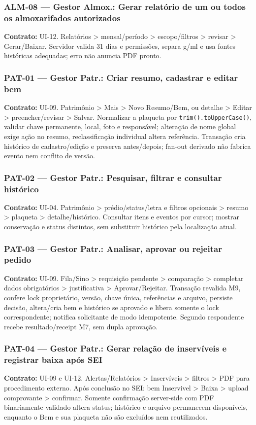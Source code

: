 \subsubsection{ALM-08 --- Gestor Almox.: Gerar relatório de um ou todos os almoxarifados autorizados}
\textbf{Contrato:} UI-12. Relatórios > mensal/período > escopo/filtros > revisar > Gerar/Baixar. Servidor valida 31 dias e permissões, separa g/ml e usa fontes históricas adequadas; erro não anuncia PDF pronto.

\subsubsection{PAT-01 --- Gestor Patr.: Criar resumo, cadastrar e editar bem}
\textbf{Contrato:} UI-09. Patrimônio > Mais > Novo Resumo/Bem, ou detalhe > Editar > preencher/revisar > Salvar. Normalizar a plaqueta por \texttt{trim().toUpperCase()}, validar chave permanente, local, foto e responsável; alteração de nome global exige ação no resumo, reclassificação individual altera referência. Transação cria histórico de cadastro/edição e preserva antes/depois; fan-out derivado não fabrica evento nem conflito de versão.

\subsubsection{PAT-02 --- Gestor Patr.: Pesquisar, filtrar e consultar histórico}
\textbf{Contrato:} UI-04. Patrimônio > prédio/status/letra e filtros opcionais > resumo > plaqueta > detalhe/histórico. Consultar itens e eventos por cursor; mostrar conservação e status distintos, sem substituir histórico pela localização atual.

\subsubsection{PAT-03 --- Gestor Patr.: Analisar, aprovar ou rejeitar pedido}
\textbf{Contrato:} UI-09. Fila/Sino > requisição pendente > comparação > completar dados obrigatórios > justificativa > Aprovar/Rejeitar. Transação revalida M9, confere lock proprietário, versão, chave única, referências e arquivo, persiste decisão, altera/cria bem e histórico se aprovado e libera somente o lock correspondente; notifica solicitante de modo idempotente. Segundo respondente recebe resultado/receipt M7, sem dupla aprovação.

\subsubsection{PAT-04 --- Gestor Patr.: Gerar relação de inservíveis e registrar baixa após SEI}
\textbf{Contrato:} UI-09 e UI-12. Alertas/Relatórios > Inservíveis > filtros > PDF para procedimento externo. Após conclusão no SEI: bem Inservivel > Baixa > upload comprovante > confirmar. Somente confirmação server-side com PDF binariamente validado altera status; histórico e arquivo permanecem disponíveis, enquanto o Bem e sua plaqueta não são excluídos nem reutilizados.

